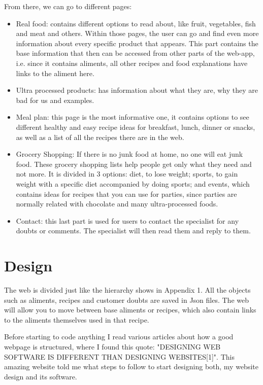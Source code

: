 \documentclass[10pt, a4paper]{article}
\begin{document}
    From there, we can go to different pages:
    \begin{itemize}
        \item Real food: contains different options to read about, like fruit, vegetables, fish and meat and others. Within those pages, the user can go and find even more information about every specific product that appears. This part contains the base information that then can be accessed from other parts of the web-app, i.e. since it contains aliments, all other recipes and food explanations have links to the aliment here.
        \item Ultra processed products: has information about what they are, why they are bad for us and examples.
        \item Meal plan: this page is the most informative one, it contains options to see different healthy and easy recipe ideas for breakfast, lunch, dinner or snacks, as well as a list of all the recipes there are in the web.
        \item Grocery Shopping: If there is no junk food at home, no one will eat junk food. These grocery shopping lists help people get only what they need and not more. It is divided in 3 options: diet, to lose weight; sports, to gain weight with a specific diet accompanied by doing sports; and events, which contains ideas for recipes that you can use for parties, since parties are normally related with chocolate and many ultra-processed foods.
        \item Contact: this last part is used for users to contact the specialist for any doubts or comments. The specialist will then read them and reply to them.
    \end{itemize}


    \section{Design}

    The web is divided just like the hierarchy shows in Appendix 1. All the objects such as aliments, recipes and customer doubts are saved in Json files. The web will allow you to move between base aliments or recipes, which also contain links to the aliments themselves used in that recipe.

    Before starting to code anything I read various articles about how a good webpage is structured, where I found this quote: "DESIGNING WEB SOFTWARE IS DIFFERENT THAN DESIGNING WEBSITES[1]". This amazing website told me what steps to follow to start designing both, my website design and its software.
\end{document}
